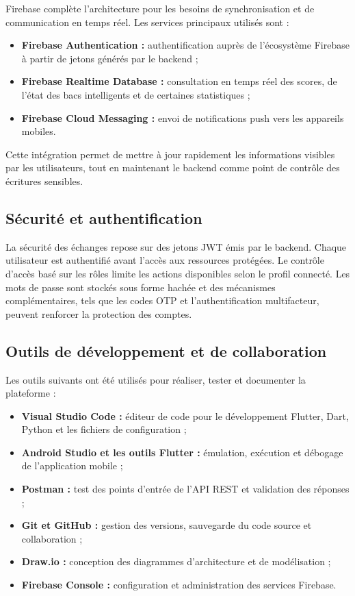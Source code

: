 Firebase complète l'architecture pour les besoins de synchronisation et de communication en temps réel. Les services principaux utilisés sont :
\begin{itemize}
    \item \textbf{Firebase Authentication :} authentification auprès de l'écosystème Firebase à partir de jetons générés par le backend ;
    \item \textbf{Firebase Realtime Database :} consultation en temps réel des scores, de l'état des bacs intelligents et de certaines statistiques ;
    \item \textbf{Firebase Cloud Messaging :} envoi de notifications push vers les appareils mobiles.
\end{itemize}

Cette intégration permet de mettre à jour rapidement les informations visibles par les utilisateurs, tout en maintenant le backend comme point de contrôle des écritures sensibles.

\subsection{Sécurité et authentification}

La sécurité des échanges repose sur des jetons JWT émis par le backend. Chaque utilisateur est authentifié avant l'accès aux ressources protégées. Le contrôle d'accès basé sur les rôles limite les actions disponibles selon le profil connecté. Les mots de passe sont stockés sous forme hachée et des mécanismes complémentaires, tels que les codes OTP et l'authentification multifacteur, peuvent renforcer la protection des comptes.

\subsection{Outils de développement et de collaboration}

Les outils suivants ont été utilisés pour réaliser, tester et documenter la plateforme :
\begin{itemize}
    \item \textbf{Visual Studio Code :} éditeur de code pour le développement Flutter, Dart, Python et les fichiers de configuration ;
    \item \textbf{Android Studio et les outils Flutter :} émulation, exécution et débogage de l'application mobile ;
    \item \textbf{Postman :} test des points d'entrée de l'API REST et validation des réponses ;
    \item \textbf{Git et GitHub :} gestion des versions, sauvegarde du code source et collaboration ;
    \item \textbf{Draw.io :} conception des diagrammes d'architecture et de modélisation ;
    \item \textbf{Firebase Console :} configuration et administration des services Firebase.
\end{itemize}

